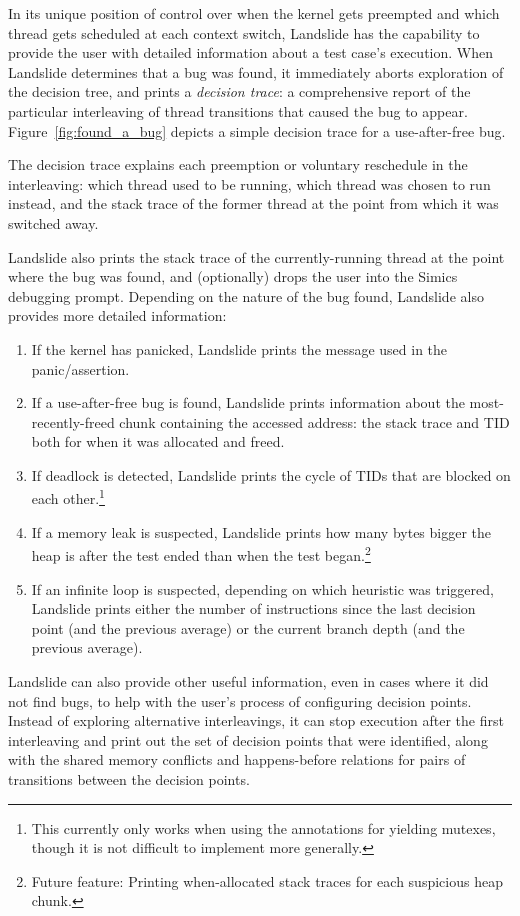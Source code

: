 In its unique position of control over when the kernel gets preempted and which thread gets scheduled at each context switch, Landslide has the capability to provide the user with detailed information about a test case's execution.
When Landslide determines that a bug was found, it immediately aborts exploration of the decision tree, and prints a {\em decision trace}: a comprehensive report of the particular interleaving of thread transitions that caused the bug to appear. Figure~\ref{fig:found_a_bug} depicts a simple decision trace for a use-after-free bug.

The decision trace explains each preemption or voluntary reschedule in the interleaving: which thread used to be running, which thread was chosen to run instead, and the stack trace of the former thread at the point from which it was switched away.

Landslide also prints the stack trace of the currently-running thread at the point where the bug was found, and (optionally) drops the user into the Simics debugging prompt. Depending on the nature of the bug found, Landslide also provides more detailed information:

\begin{enumerate}
	\item If the kernel has panicked, Landslide prints the message used in the panic/assertion.
	\item If a use-after-free bug is found, Landslide prints information about the most-recently-freed chunk containing the accessed address: the stack trace and TID both for when it was allocated and freed.
	\item If deadlock is detected, Landslide prints the cycle of TIDs that are blocked on each other.\footnote{This currently only works when using the annotations for yielding mutexes, though it is not difficult to implement more generally.}
	\item If a memory leak is suspected, Landslide prints how many bytes bigger the heap is after the test ended than when the test began.\footnote{Future feature: Printing when-allocated stack traces for each suspicious heap chunk.}
	\item If an infinite loop is suspected, depending on which heuristic was triggered, Landslide prints either the number of instructions since the last decision point (and the previous average) or the current branch depth (and the previous average).
\end{enumerate}

Landslide can also provide other useful information, even in cases where it did not find bugs, to help with the user's process of configuring decision points. Instead of exploring alternative interleavings, it can stop execution after the first interleaving and print out the set of decision points that were identified, along with the shared memory conflicts and happens-before relations for pairs of transitions between the decision points.
